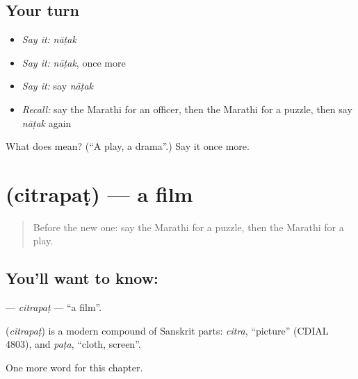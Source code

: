 \subsection*{Your turn}
\begin{itemize}
\raggedright
  \item \emph{Say it:} \emph{nāṭak}
  \item \emph{Say it:} \emph{nāṭak}, once more
  \item \emph{Say it:} say \emph{nāṭak}
  \item \emph{Recall:} say the Marathi for an officer, then the Marathi for a puzzle, then say \emph{nāṭak} again
\end{itemize}

\begin{tcolorbox}[breakable,colback=teal!4,colframe=teal!35!black,title={Before you move on}]
What does  mean? (\textquotedblleft{}A play, a drama\textquotedblright{}.) Say it once more.
\end{tcolorbox}
\section[\texorpdfstring{\mr{चित्रपट} (citrapaṭ)}{चित्रपट (citrapaṭ)}]{ (citrapaṭ) — a film}

\label{lesson:MR-C275-citrapat}



\begin{quote}
Before the new one: say the Marathi for a puzzle, then the Marathi for a play.
\end{quote}

\subsection*{You'll want to know: }
\textbf{} — \emph{citrapaṭ} — \textquotedblleft{}a film\textquotedblright{}.

\begin{cousinweb}
\textbf{} (\emph{citrapaṭ}) is a modern compound of Sanskrit parts: \emph{citra}, \textquotedblleft{}picture\textquotedblright{} (CDIAL 4803), and \emph{paṭa}, \textquotedblleft{}cloth, screen\textquotedblright{}.
\end{cousinweb}

\begin{grammarlens}[title={What you've built}]
One more word for this chapter.
\end{grammarlens}

